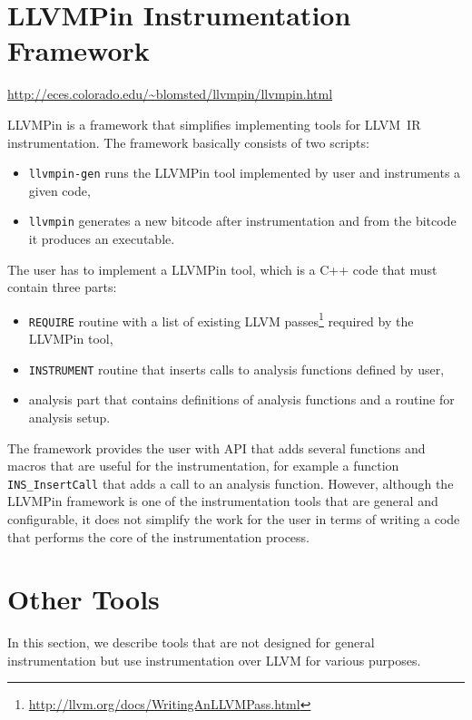 \section{LLVMPin Instrumentation Framework}

\url{http://eces.colorado.edu/~blomsted/llvmpin/llvmpin.html}
\medskip

LLVMPin is a framework that simplifies implementing tools for LLVM~IR
instrumentation. The framework basically consists of two scripts:

\begin{itemize}
    \item \texttt{llvmpin-gen} runs the LLVMPin tool implemented by
          user and instruments a given code,
    \item \texttt{llvmpin} generates a new
	  bitcode after instrumentation and from the bitcode it produces an
          executable.
\end{itemize}

The user has to implement a LLVMPin tool, which is a C++ code that must contain three
parts:

\begin{itemize}
    \item \texttt{REQUIRE} routine with a list of existing LLVM
          passes\footnote{\url{http://llvm.org/docs/WritingAnLLVMPass.html}} required by
          the LLVMPin tool,
    \item \texttt{INSTRUMENT} routine that inserts calls to analysis functions
          defined by user,
    \item analysis part that contains definitions of analysis functions and a
          routine for analysis setup.
\end{itemize}

The framework provides the user with API that adds several functions and macros
that are useful for the instrumentation, for example a function
\texttt{INS\_InsertCall} that adds a call to an analysis function. However,
although the LLVMPin framework is one of the instrumentation tools that are
general and configurable, it does not simplify the work for the user in terms
of writing a code that performs the core of the instrumentation process.

\section{Other Tools}

In this section, we describe tools that are not designed for general
instrumentation but use instrumentation over LLVM for various purposes.

